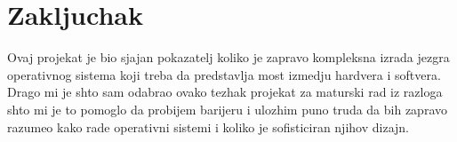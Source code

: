 \documentclass[a4paper,fleqn,12pt]{JMThesis}
\begin{document}
\chapter{Zakljuchak}
Ovaj projekat je bio sjajan pokazatelj koliko je zapravo kompleksna izrada
jezgra operativnog sistema koji treba da predstavlja most izmedju hardvera i
softvera. Drago mi je shto sam odabrao ovako tezhak projekat za maturski rad iz
razloga shto mi je to pomoglo da probijem barijeru i ulozhim puno truda da bih
zapravo razumeo kako rade operativni sistemi i koliko je sofisticiran njihov
dizajn.

\thispagestyle{empty}
\mbox{}
\clearpage

\nocite{*}
\printbibliography[heading=bibintoc,title={Literatura}]
\end{document}
